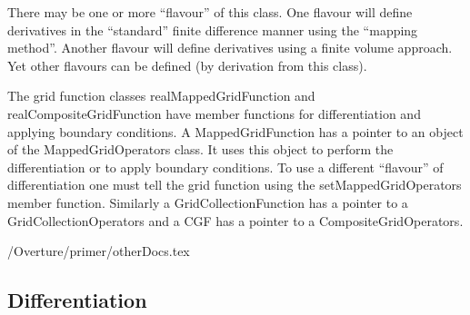 \documentclass[12pt]{article}
\newcommand{\primer}{\homeHenshaw/Overture/primer}
\newcommand{\MGF}{MappedGridFunction}
\newcommand{\MGO}{MappedGridOperators}
\newcommand{\GCO}{Grid\-Collection\-Operators}
\newcommand{\CGO}{Composite\-Grid\-Operators}
\newcommand{\GCF}{GridCollectionFunction}
\begin{document}
There may be one or more ``flavour'' of this class. One flavour
will define derivatives in the ``standard'' finite difference
manner using the ``mapping method''. Another flavour will define
derivatives using a finite volume approach. Yet other flavours
can be defined (by derivation from this class).

The grid function classes {\ff realMappedGridFunction} and
{\ff realCompositeGridFunction} 
have member functions for differentiation
and applying boundary conditions. 
A {\ff \MGF} has a pointer
to an object of the {\ff \MGO} class.
It uses this object to perform the differentiation or to
apply boundary conditions. To use a different ``flavour'' of
differentiation one must tell the grid function using the
{\ff set\MGO} member function. Similarly a {\ff \GCF}
has a pointer to a {\ff \GCO} and a {\ff CGF} has a 
pointer to a {\ff \CGO}.

 \primer/otherDocs.tex

% 
% 
% 
% 

\subsection{Differentiation}
\end{document}
